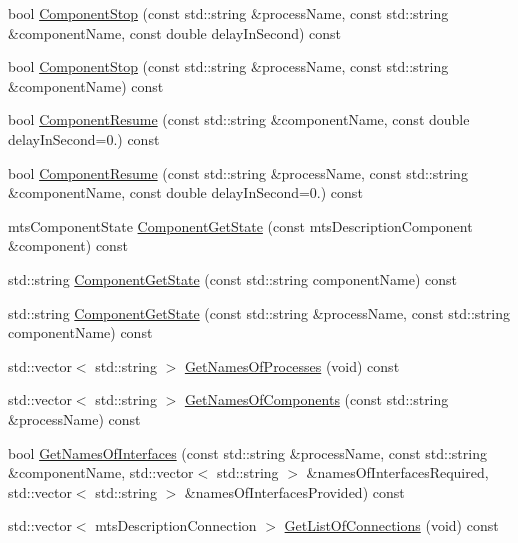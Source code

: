 \begin{DoxyCompactItemize}
\item 
bool \hyperlink{classmts_manager_component_services_a85c5932959c5749a94f2c5ddcd827955}{Component\+Stop} (const std\+::string \&process\+Name, const std\+::string \&component\+Name, const double delay\+In\+Second) const 
\item 
bool \hyperlink{classmts_manager_component_services_ad812caeaf90184905e3018dd9a179656}{Component\+Stop} (const std\+::string \&process\+Name, const std\+::string \&component\+Name) const 
\item 
bool \hyperlink{classmts_manager_component_services_a1a7c9681b7c4cca3eac66609e25ecf02}{Component\+Resume} (const std\+::string \&component\+Name, const double delay\+In\+Second=0.) const 
\item 
bool \hyperlink{classmts_manager_component_services_a06266b2614a2607b2e1f645c0f26de17}{Component\+Resume} (const std\+::string \&process\+Name, const std\+::string \&component\+Name, const double delay\+In\+Second=0.) const 
\item 
mts\+Component\+State \hyperlink{classmts_manager_component_services_a45db338b5d8dca05cbfaa23494f4719d}{Component\+Get\+State} (const mts\+Description\+Component \&component) const 
\item 
std\+::string \hyperlink{classmts_manager_component_services_ad46de601398935707428ad4f4d5438b8}{Component\+Get\+State} (const std\+::string component\+Name) const 
\item 
std\+::string \hyperlink{classmts_manager_component_services_abfd5fbf1f42ddd2278acdedbf77303f9}{Component\+Get\+State} (const std\+::string \&process\+Name, const std\+::string component\+Name) const 
\item 
std\+::vector$<$ std\+::string $>$ \hyperlink{classmts_manager_component_services_af961f84fde69fcaf76f1d070e9c5d712}{Get\+Names\+Of\+Processes} (void) const 
\item 
std\+::vector$<$ std\+::string $>$ \hyperlink{classmts_manager_component_services_af3aee169d9fc69f0807784371bbf488f}{Get\+Names\+Of\+Components} (const std\+::string \&process\+Name) const 
\item 
bool \hyperlink{classmts_manager_component_services_a51b7abf298cced848c5f967e6dc25f81}{Get\+Names\+Of\+Interfaces} (const std\+::string \&process\+Name, const std\+::string \&component\+Name, std\+::vector$<$ std\+::string $>$ \&names\+Of\+Interfaces\+Required, std\+::vector$<$ std\+::string $>$ \&names\+Of\+Interfaces\+Provided) const 
\item 
std\+::vector$<$ mts\+Description\+Connection $>$ \hyperlink{classmts_manager_component_services_a758b2e80128800532561668d67ad1a1d}{Get\+List\+Of\+Connections} (void) const 

\end{DoxyCompactItemize}
